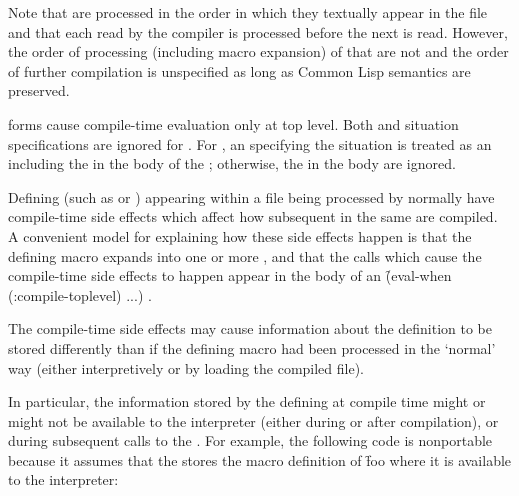 Note that  are processed in the order in
which they textually appear in the file and that each 
 read by the compiler is processed before the next is
read.  However, the order of processing (including macro expansion) of
 that are not  and the order of
further compilation is unspecified as long as Common Lisp semantics
are preserved.

\endlist 
 
 forms cause compile-time evaluation only at
top level.  Both  and  situation specifications
are ignored for . For , 
an 
specifying the  situation is treated as an 
including the  in the body of the  ;
otherwise, the  in the body are ignored.




Defining  (such as  or )
appearing within a file being processed by 
normally have compile-time side effects which affect how subsequent 
in the same  are compiled.  A convenient model for explaining how these
side effects happen is that the defining macro expands into one or
more  , and that the calls which cause the compile-time
side effects to happen appear 
in the body of an \f{(eval-when (:compile-toplevel) ...)} .

The compile-time side effects may cause information about the definition to
be stored differently than if the defining macro had been processed in the
`normal' way (either interpretively or by loading the compiled file).

In particular, the information stored by the defining  at compile time
might or might not be available to the interpreter (either during or after compilation),
or during subsequent calls to the .  For example,
the following code is nonportable because it assumes that the 
stores the macro definition of \f{foo} where it is available to the interpreter:
    
